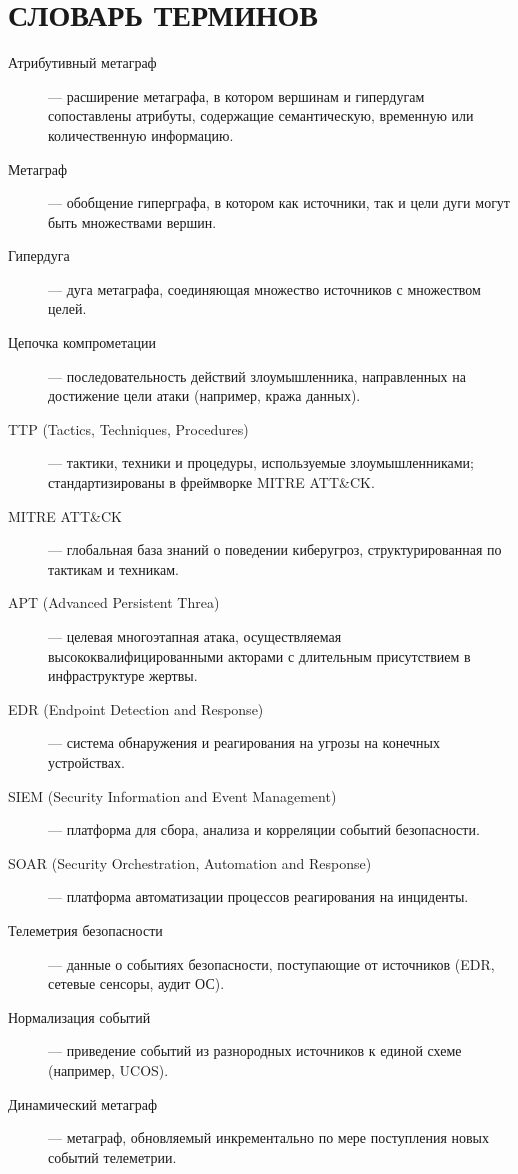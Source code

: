 
\chapter*{СЛОВАРЬ ТЕРМИНОВ}

\begin{description}
    \item[Атрибутивный метаграф] — расширение метаграфа, в котором вершинам и гипердугам сопоставлены атрибуты, содержащие семантическую, временную или количественную информацию.
    \item[Метаграф] — обобщение гиперграфа, в котором как источники, так и цели дуги могут быть множествами вершин.
    \item[Гипердуга] — дуга метаграфа, соединяющая множество источников с множеством целей.
    \item[Цепочка компрометации] — последовательность действий злоумышленника, направленных на достижение цели атаки (например, кража данных).
    \item[TTP (Tactics, Techniques, Procedures)] — тактики, техники и процедуры, используемые злоумышленниками; стандартизированы в фреймворке MITRE ATT\&CK.
    \item[MITRE ATT\&CK] — глобальная база знаний о поведении киберугроз, структурированная по тактикам и техникам.
    \item[APT (Advanced Persistent Threa)] — целевая многоэтапная атака, осуществляемая высококвалифицированными акторами с длительным присутствием в инфраструктуре жертвы.
    \item[EDR (Endpoint Detection and Response)] — система обнаружения и реагирования на угрозы на конечных устройствах.
    \item[SIEM (Security Information and Event Management)] — платформа для сбора, анализа и корреляции событий безопасности.
    \item[SOAR (Security Orchestration, Automation and Response)] — платформа автоматизации процессов реагирования на инциденты.
    \item[Телеметрия безопасности] — данные о событиях безопасности, поступающие от источников (EDR, сетевые сенсоры, аудит ОС).
    \item[Нормализация событий] — приведение событий из разнородных источников к единой схеме (например, UCOS).
    \item[Динамический метаграф] — метаграф, обновляемый инкрементально по мере поступления новых событий телеметрии.

\end{description}
